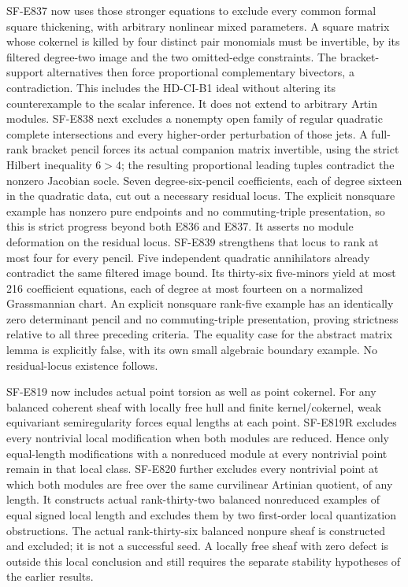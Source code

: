 \documentclass[11pt]{article}
\theoremstyle{remark}\newtheorem{remark}[theorem]{Remark}
\begin{document}
SF-E837 now uses those stronger equations to exclude every common
formal square thickening, with arbitrary nonlinear mixed parameters.
A square matrix whose cokernel is killed by four distinct pair
monomials must be invertible, by its filtered degree-two image and
the two omitted-edge constraints. The bracket-support alternatives
then force proportional complementary bivectors, a contradiction.
This includes the HD-CI-B1 ideal without altering its counterexample
to the scalar inference. It does not extend to arbitrary Artin modules.
SF-E838 next excludes a nonempty open family of regular quadratic
complete intersections and every higher-order perturbation of those
jets. A full-rank bracket pencil forces its actual companion matrix
invertible, using the strict Hilbert inequality $6>4$; the resulting
proportional leading tuples contradict the nonzero Jacobian socle.
Seven degree-six-pencil coefficients, each of degree sixteen in the
quadratic data, cut out a necessary residual locus. The explicit
nonsquare example has nonzero pure endpoints and no commuting-triple
presentation, so this is strict progress beyond both E836 and E837.
It asserts no module deformation on the residual locus.
SF-E839 strengthens that locus to rank at most four for every pencil.
Five independent quadratic annihilators already contradict the same
filtered image bound. Its thirty-six five-minors yield at most 216
coefficient equations, each of degree at most fourteen on a normalized
Grassmannian chart. An explicit nonsquare rank-five example has an
identically zero determinant pencil and no commuting-triple presentation,
proving strictness relative to all three preceding criteria. The equality
case for the abstract matrix lemma is explicitly false, with its own
small algebraic boundary example. No residual-locus existence follows.

SF-E819 now includes actual point torsion as well as point cokernel.
For any balanced coherent sheaf with locally free hull and finite
kernel/cokernel, weak equivariant semiregularity forces equal lengths
at each point. SF-E819R excludes every nontrivial local modification
when both modules are reduced. Hence only equal-length modifications
with a nonreduced module at every nontrivial point remain in that local
class. SF-E820 further excludes every nontrivial point at which both
modules are free over the same curvilinear Artinian quotient, of any
length. It constructs actual rank-thirty-two balanced nonreduced
examples of equal signed local length and excludes them by two
first-order local quantization obstructions. The actual rank-thirty-six balanced nonpure sheaf is constructed
and excluded; it is not a successful seed. A locally free sheaf with
zero defect is outside this local conclusion and still requires the
separate stability hypotheses of the earlier results.
\end{document}
